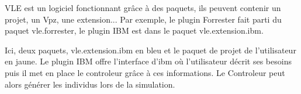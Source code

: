 VLE est un logiciel fonctionnant grâce à des paquets, ils peuvent contenir un projet, un Vpz, une extension... Par exemple, le plugin Forrester fait parti du paquet vle.forrester, le plugin IBM est dans le paquet vle.extension.ibm.\\

\noindent\begin{minipage}{\linewidth}%
\end{minipage}

Ici, deux paquets, vle.extension.ibm en bleu et le paquet de projet de l'utilisateur en jaune. Le plugin IBM offre l'interface d'ibm où l'utilisateur décrit ses besoins puis il met en place le controleur grâce à ces informations. Le Controleur peut alors générer les individus lors de la simulation.

